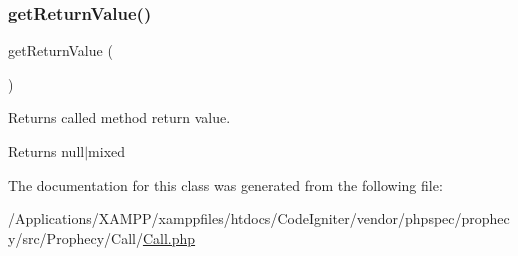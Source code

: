 \subsubsection{\texorpdfstring{get\+Return\+Value()}{getReturnValue()}}
{\footnotesize\ttfamily get\+Return\+Value (\begin{DoxyParamCaption}{ }\end{DoxyParamCaption})}

Returns called method return value.

\begin{DoxyReturn}{Returns}
null$\vert$mixed 
\end{DoxyReturn}


The documentation for this class was generated from the following file\+:\begin{DoxyCompactItemize}
\item 
/\+Applications/\+X\+A\+M\+P\+P/xamppfiles/htdocs/\+Code\+Igniter/vendor/phpspec/prophecy/src/\+Prophecy/\+Call/\mbox{\hyperlink{_call_8php}{Call.\+php}}\end{DoxyCompactItemize}
